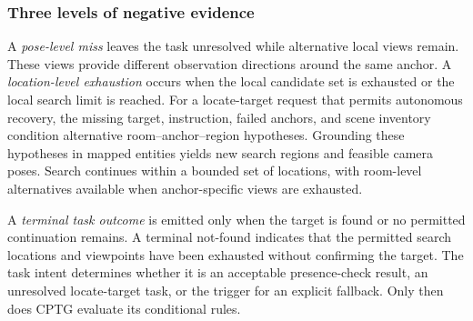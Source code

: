 \documentclass[letterpaper,10pt,journal]{IEEEtran}
\begin{document}
\subsubsection{Three levels of negative evidence}
A \emph{pose-level miss} leaves the task unresolved while alternative local views remain. These views provide different observation directions around the same anchor. A \emph{location-level exhaustion} occurs when the local candidate set is exhausted or the local search limit is reached. For a locate-target request that permits autonomous recovery, the missing target, instruction, failed anchors, and scene inventory condition alternative room--anchor--region hypotheses. Grounding these hypotheses in mapped entities yields new search regions and feasible camera poses. Search continues within a bounded set of locations, with room-level alternatives available when anchor-specific views are exhausted.

A \emph{terminal task outcome} is emitted only when the target is found or no permitted continuation remains. A terminal not-found indicates that the permitted search locations and viewpoints have been exhausted without confirming the target. The task intent determines whether it is an acceptable presence-check result, an unresolved locate-target task, or the trigger for an explicit fallback. Only then does CPTG evaluate its conditional rules.
\end{document}

